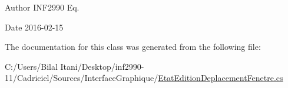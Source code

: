 \begin{DoxyAuthor}{Author}
I\+N\+F2990 Eq. 
\end{DoxyAuthor}
\begin{DoxyDate}{Date}
2016-\/02-\/15 
\end{DoxyDate}


The documentation for this class was generated from the following file\+:\begin{DoxyCompactItemize}
\item 
C\+:/\+Users/\+Bilal Itani/\+Desktop/inf2990-\/11/\+Cadriciel/\+Sources/\+Interface\+Graphique/\hyperlink{_etat_edition_deplacement_fenetre_8cs}{Etat\+Edition\+Deplacement\+Fenetre.\+cs}\end{DoxyCompactItemize}
